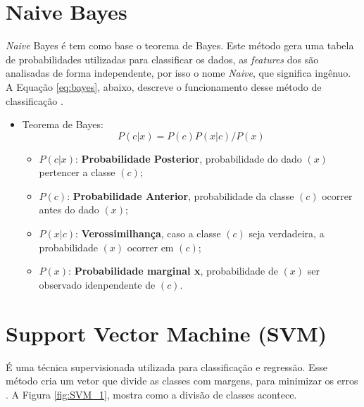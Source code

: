 \section{Naive Bayes}

\textit{Naive} Bayes é tem como base o teorema de Bayes. Este método
gera uma tabela de probabilidades utilizadas para classificar os dados, as \textit{features} dos 
são analisadas de forma independente, por isso o nome \textit{Naive}, que significa
ingênuo. A Equação \ref{eq:bayes}, abaixo, descreve o funcionamento desse método de classificação \cite{BattaMahesh2018}.

\begin{itemize}
    \item Teorema de Bayes:
    \begin{equation}
        P(c|x) = P(c)P(x|c)/P(x)
        \label{eq:bayes}
    \end{equation}

    \begin{itemize}
        \item $P(c|x)$: \textbf{Probabilidade Posterior}, probabilidade do dado $(x)$ pertencer a classe $(c)$;
        \item $P(c)$: \textbf{Probabilidade Anterior}, probabilidade da classe $(c)$ ocorrer antes do dado $(x)$;
        \item $P(x|c)$: \textbf{Verossimilhança}, caso a classe $(c)$ seja verdadeira, a probabilidade $(x)$ ocorrer em $(c)$;
        \item $P(x)$: \textbf{Probabilidade marginal x}, probabilidade de $(x)$ ser observado idenpendente de $(c)$.
    \end{itemize}
\end{itemize}




\section{Support Vector Machine (SVM)}

É uma técnica supervisionada utilizada para classificação e regressão. Esse método cria um vetor que divide as classes
com margens, para minimizar os erros \cite{BattaMahesh2018}. A Figura \ref{fig:SVM_1}, mostra como a divisão de classes
acontece.

